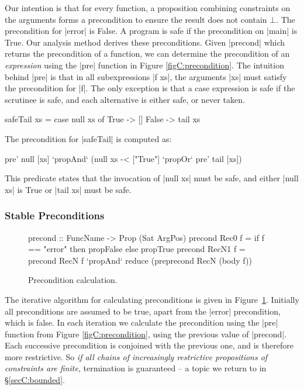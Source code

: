 Our intention is that for every function, a proposition combining constraints on the arguments forms a precondition to ensure the result does not contain $\bot{}$. The precondition for |error| is False. A program is safe if the precondition on |main| is True. Our analysis method derives these preconditions. Given |precond| which returns the precondition of a function, we can determine the precondition of an \textit{expression} using the |pre| function in Figure \ref{figC:precondition}. The intuition behind |pre| is that in all subexpressions |f xs|, the arguments |xs| must satisfy the precondition for |f|. The only exception is that a case expression is safe if the scrutinee is safe, and each alternative is either safe, or never taken.

\begin{example}
\label{exC:safeTail}
\begin{code}
safeTail xs = case  null xs of
                    True   -> []
                    False  -> tail xs
\end{code}

\noindent The precondition for |safeTail| is computed as:

\ignore\begin{code}
pre' null [xs] `propAnd` (null xs -< ["True"] `propOr` pre' tail [xs])
\end{code}

This predicate states that the invocation of |null xs| must be safe, and either |null xs| is True or |tail xs| must be safe.
\end{example}


\subsubsection{Stable Preconditions}
\label{secC:fixp_precond}


\begin{figure}
\ignore\begin{code}
precond  :: FuncName -> Prop (Sat ArgPos)
precond Rec0   f =  if f == "error" then propFalse else propTrue
precond RecN1  f =  precond RecN f `propAnd`
                    reduce (pre{precond RecN} (body f))
\end{code}
\caption{Precondition calculation.}
\label{figC:precond_fixp}
\end{figure}

The iterative algorithm for calculating preconditions is given in Figure~\ref{figC:precond_fixp}. Initially all preconditions are assumed to be true, apart from the |error| precondition, which is false. In each iteration we calculate the precondition using the |pre| function from Figure \ref{figC:precondition}, using the previous value of |precond|. Each successive precondition is conjoined with the previous one, and is therefore more restrictive. So \textit{if all chains of increasingly restrictive propositions of constraints are finite}, termination is guaranteed -- a topic we return to in \S\ref{secC:bounded}.

